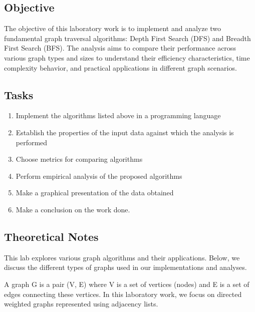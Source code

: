 \documentclass[a4paper,12pt]{article}
\begin{document}
\subsection{Objective}
\label{sec:org6b96727}
The objective of this laboratory work is to implement and analyze two fundamental graph traversal algorithms: Depth First Search (DFS) and Breadth First Search (BFS). The analysis aims to compare their performance across various graph types and sizes to understand their efficiency characteristics, time complexity behavior, and practical applications in different graph scenarios.
\subsection{Tasks}
\label{sec:org719c51f}
\begin{enumerate}
\item Implement the algorithms listed above in a programming language
\item Establish the properties of the input data against which the analysis is performed
\item Choose metrics for comparing algorithms
\item Perform empirical analysis of the proposed algorithms
\item Make a graphical presentation of the data obtained
\item Make a conclusion on the work done.
\end{enumerate}
\subsection{Theoretical Notes}
\label{sec:orgb0e5ee2}

This lab explores various graph algorithms and their applications. Below, we discuss the different types of graphs used in our implementations and analyses.

A graph G is a pair (V, E) where V is a set of vertices (nodes) and E is a set of edges connecting these vertices. In this laboratory work, we focus on directed weighted graphs represented using adjacency lists.
\end{document}
